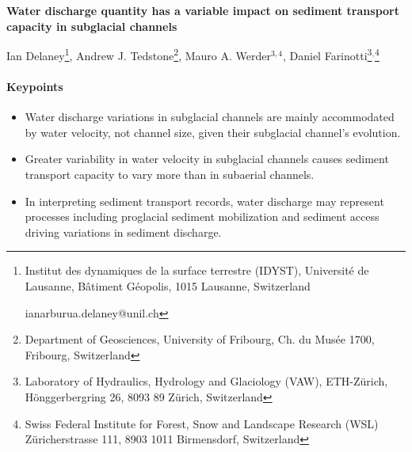 \documentclass[11pt]{article}
\begin{document}
%
%


\begin{center}
  \Large{\textbf{Water discharge quantity has a variable impact on sediment transport capacity in subglacial channels}}
  \normalsize

  Ian Delaney\footnote{Institut des dynamiques de la surface terrestre (IDYST), Universit\'{e} de Lausanne, B\^{a}timent G\'{e}opolis, 1015 Lausanne, Switzerland

    ianarburua.delaney@unil.ch},
  Andrew J. Tedstone\footnote{Department of Geosciences, University of Fribourg, Ch. du Musée 1700, Fribourg, Switzerland},
   Mauro A. Werder$^{3,4}$,
  Daniel Farinotti\footnote{Laboratory of Hydraulics, Hydrology and Glaciology (VAW), ETH-Z\"urich, H\"onggerbergring 26, 8093 89 Z\"urich, Switzerland}$^{,}$\footnote{Swiss Federal Institute for Forest, Snow and Landscape Research (WSL) Z\"uricherstrasse 111, 8903 1011 Birmensdorf, Switzerland}
 
\end{center}

\paragraph{Keypoints}
\begin{itemize}
\item Water discharge variations in subglacial channels are mainly accommodated by water velocity, not channel size, given their subglacial channel's evolution.

\item Greater variability in water velocity in subglacial channels causes sediment transport capacity to vary more than in subaerial channels.

\item In interpreting sediment transport records, water discharge may represent processes including proglacial sediment mobilization and sediment access driving variations in sediment discharge.
\end{itemize}
\end{document}
